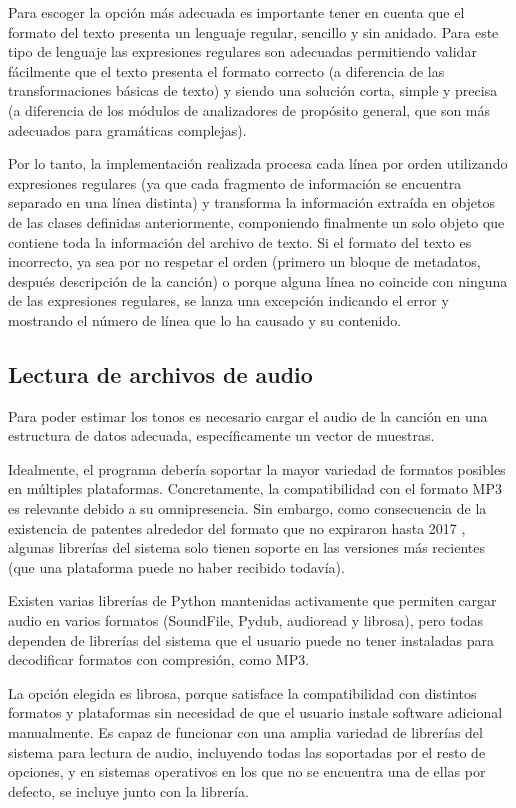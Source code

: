 Para escoger la opción más adecuada es importante tener en cuenta que el formato del texto presenta un lenguaje regular, sencillo y sin anidado. Para este tipo de lenguaje las expresiones regulares son adecuadas permitiendo validar fácilmente que el texto presenta el formato correcto (a diferencia de las transformaciones básicas de texto) y siendo una solución corta, simple y precisa (a diferencia de los módulos de analizadores de propósito general, que son más adecuados para gramáticas complejas).

Por lo tanto, la implementación realizada procesa cada línea por orden utilizando expresiones regulares (ya que cada fragmento de información se encuentra separado en una línea distinta) y transforma la información extraída en objetos de las clases definidas anteriormente, componiendo finalmente un solo objeto que contiene toda la información del archivo de texto.  Si el formato del texto es incorrecto, ya sea por no respetar el orden (primero un bloque de metadatos, después descripción de la canción) o porque alguna línea no coincide con ninguna de las expresiones regulares, se lanza una excepción indicando el error y mostrando el número de línea que lo ha causado y su contenido.


\subsection{Lectura de archivos de audio}

Para poder estimar los tonos es necesario cargar el audio de la canción en una estructura de datos adecuada, específicamente un vector de muestras.

Idealmente, el programa debería soportar la mayor variedad de formatos posibles en múltiples plataformas. Concretamente, la compatibilidad con el formato MP3 es relevante debido a su omnipresencia. Sin embargo, como consecuencia de la existencia de patentes alrededor del formato que no expiraron hasta 2017 \cite{mp3patents}, algunas librerías del sistema solo tienen soporte en las versiones más recientes (que una plataforma puede no haber recibido todavía).

Existen varias librerías de Python mantenidas activamente que permiten cargar audio en varios formatos (SoundFile, Pydub, audioread y librosa), pero todas dependen de librerías del sistema que el usuario puede no tener instaladas para decodificar formatos con compresión, como MP3.

La opción elegida es librosa, porque satisface la compatibilidad con distintos formatos y plataformas sin necesidad de que el usuario instale software adicional manualmente. Es capaz de funcionar con una amplia variedad de librerías del sistema para lectura de audio, incluyendo todas las soportadas por el resto de opciones, y en sistemas operativos en los que no se encuentra una de ellas por defecto, se incluye junto con la librería.

